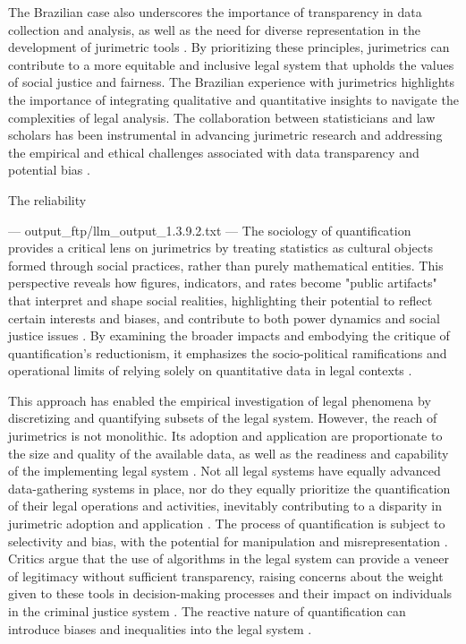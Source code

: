 The Brazilian case also underscores the importance of transparency in data collection and analysis, as well as the need for diverse representation in the development of jurimetric tools \cite{10.1590/data.2022.65.3.267,10.1007/978-3-319-44000-2_15}. By prioritizing these principles, jurimetrics can contribute to a more equitable and inclusive legal system that upholds the values of social justice and fairness. The Brazilian experience with jurimetrics highlights the importance of integrating qualitative and quantitative insights to navigate the complexities of legal analysis. The collaboration between statisticians and law scholars has been instrumental in advancing jurimetric research and addressing the empirical and ethical challenges associated with data transparency and potential bias \cite{10.1007/s11186-021-09453-1,10.3390/fi9040068}.

The reliability


---
output_ftp/llm_output_1.3.9.2.txt
---
The sociology of quantification provides a critical lens on jurimetrics by treating statistics as cultural objects formed through social practices, rather than purely mathematical entities. This perspective reveals how figures, indicators, and rates become "public artifacts" that interpret and shape social realities, highlighting their potential to reflect certain interests and biases, and contribute to both power dynamics and social justice issues \cite{camargo2021,paiva2021}. By examining the broader impacts and embodying the critique of quantification’s reductionism, it emphasizes the socio-political ramifications and operational limits of relying solely on quantitative data in legal contexts \cite{sousa2024,saltelli2020}.

This approach has enabled the empirical investigation of legal phenomena by discretizing and quantifying subsets of the legal system. However, the reach of jurimetrics is not monolithic. Its adoption and application are proportionate to the size and quality of the available data, as well as the readiness and capability of the implementing legal system \cite{losano2006}. Not all legal systems have equally advanced data-gathering systems in place, nor do they equally prioritize the quantification of their legal operations and activities, inevitably contributing to a disparity in jurimetric adoption and application \cite{losano2006}. The process of quantification is subject to selectivity and bias, with the potential for manipulation and misrepresentation \cite{losano2006}. Critics argue that the use of algorithms in the legal system can provide a veneer of legitimacy without sufficient transparency, raising concerns about the weight given to these tools in decision-making processes and their impact on individuals in the criminal justice system \cite{losano2006}. The reactive nature of quantification can introduce biases and inequalities into the legal system \cite{losano2006}.

